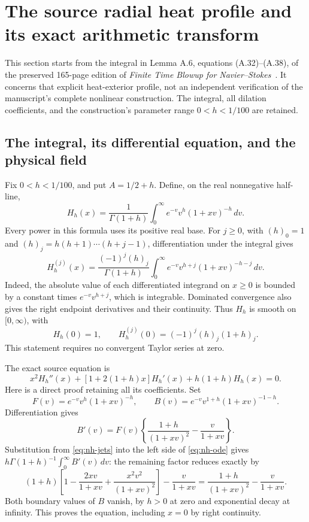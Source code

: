 \section{The source radial heat profile and its exact arithmetic transform}
\label{sec:ns-source-heat-arithmetic}

This section starts from the integral in Lemma A.6, equations
(A.32)--(A.38), of the preserved 165-page edition of
\emph{Finite Time Blowup for Navier--Stokes}~\cite{openaiNS2026release}.
It concerns that explicit heat-exterior profile, not an independent
verification of the manuscript's complete nonlinear construction.
The integral, all dilation coefficients, and the construction's parameter
range \(0<h<1/100\) are retained.

\subsection{The integral, its differential equation, and the physical field}

Fix \(0<h<1/100\), and put \(A=1/2+h\). Define, on the real
nonnegative half-line,
\begin{equation}\label{eq:nh-profile}
 H_h(x)=\frac1{\Gamma(1+h)}
       \int_0^\infty e^{-v}v^h(1+xv)^{-h}\,dv .
\end{equation}
Every power in this formula uses its positive real base. For \(j\ge0\),
with \((h)_0=1\) and \((h)_j=h(h+1)\cdots(h+j-1)\), differentiation
under the integral gives
\begin{equation}\label{eq:nh-jets}
 H_h^{(j)}(x)=\frac{(-1)^j(h)_j}{\Gamma(1+h)}
 \int_0^\infty e^{-v}v^{h+j}(1+xv)^{-h-j}\,dv .
\end{equation}
Indeed, the absolute value of each differentiated integrand on \(x\ge0\)
is bounded by a constant times \(e^{-v}v^{h+j}\), which is integrable.
Dominated convergence also gives the right endpoint derivatives and their
continuity. Thus \(H_h\) is smooth on \([0,\infty)\), with
\[
 H_h(0)=1,\qquad H_h^{(j)}(0)=(-1)^j(h)_j(1+h)_j .
\]
This statement requires no convergent Taylor series at zero.

The exact source equation is
\begin{equation}\label{eq:nh-ode}
 x^2H_h''(x)+[1+2(1+h)x]H_h'(x)+h(1+h)H_h(x)=0 .
\end{equation}
Here is a direct proof retaining all its coefficients. Set
\[
 F(v)=e^{-v}v^h(1+xv)^{-h},\qquad
 B(v)=e^{-v}v^{1+h}(1+xv)^{-1-h}.
\]
Differentiation gives
\[
 B'(v)=F(v)\left\{\frac{1+h}{(1+xv)^2}
                         -\frac v{1+xv}\right\}.
\]
Substitution from \eqref{eq:nh-jets} into the left side of
\eqref{eq:nh-ode} gives \(h\Gamma(1+h)^{-1}\int_0^\infty B'(v)\,dv\):
the remaining factor reduces exactly by
\[
 (1+h)\left[1-\frac{2xv}{1+xv}
                   +\frac{x^2v^2}{(1+xv)^2}\right]
       -\frac v{1+xv}
 =\frac{1+h}{(1+xv)^2}-\frac v{1+xv}.
\]
Both boundary values of \(B\) vanish, by \(h>0\) at zero and
exponential decay at infinity. This proves the equation, including \(x=0\)
by right continuity.

